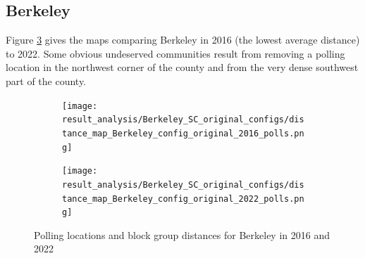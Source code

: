 \documentclass[11pt]{article}
\theoremstyle{remark}
\theoremstyle{definition}
\begin{document}

\subsection{Berkeley}
Figure \ref{fig:Berkeley distance maps} gives the maps comparing Berkeley in 2016 (the lowest average distance) to 2022. Some obvious undeserved communities result from removing a polling location in the northwest corner of the county and from the very dense southwest part of the county.


\begin{figure}
	\begin{subfigure}{.5\textwidth}
		\centering
		\texttt{[image: result\_analysis/Berkeley\_SC\_original\_configs/distance\_map\_Berkeley\_config\_original\_2016\_polls.png]}
		\label{sfig:York_2016_bg_dist}
	\end{subfigure} 
	\begin{subfigure}{.5\textwidth}
		\centering
		\texttt{[image: result\_analysis/Berkeley\_SC\_original\_configs/distance\_map\_Berkeley\_config\_original\_2022\_polls.png]}
		\label{sfig:Berkeley_2022_bg_dist}
	\end{subfigure}
	\caption{Polling locations and block group distances for Berkeley in 2016 and 2022}
	\label{fig:Berkeley distance maps}
\end{figure}
\end{document}
